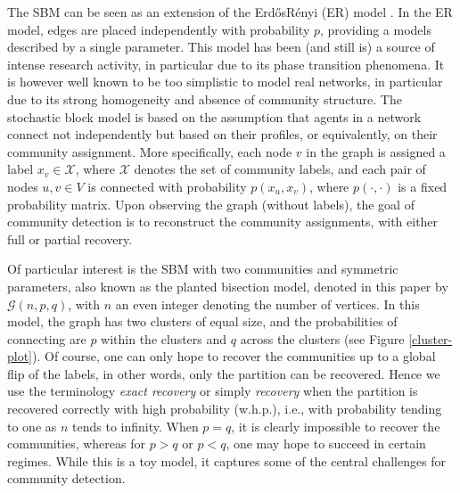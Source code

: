 \documentclass[english]{article}
\newcommand{\X}{\mathcal{X}}
\newcommand{\1}{\textbf{1}}
\begin{document}
The SBM can be seen as an extension of the Erd\H{o}sR\'enyi (ER) model \cite{ER-seminal,ER2}. 
In the ER model, edges are placed independently with probability $p$, providing a models described by a single parameter.
This model has been (and still is) a source of intense research activity, in particular due to its phase transition phenomena.  
It is however well known to be too simplistic to model real networks, in particular due to its strong homogeneity and absence of community structure. 
The stochastic block model is based on the assumption that agents in a network connect not independently but based on their profiles, or equivalently, on their community assignment. 
More specifically, each node $v$ in the graph is assigned a label $x_v \in \X$, where $\X$ denotes the set of community labels, and each pair of nodes $u,v \in V$ is connected with probability $p(x_u,x_v)$, where $p(\cdot, \cdot)$ is a fixed probability matrix. Upon observing the graph (without labels), the goal of community detection is to reconstruct the community assignments, with either full or partial recovery.%


Of particular interest is the SBM with two communities and symmetric parameters, also known as the planted bisection model, denoted in this paper by $\mathcal{G}(n,p,q)$, with $n$ an even integer denoting the number of vertices. In this model, the graph has two clusters of equal size, and the probabilities of connecting are $p$ within the clusters and $q$ across the clusters (see Figure \ref{cluster-plot}). Of course, one can only hope to recover the communities up to a global flip of the labels, in other words, only the partition can be recovered. Hence we use the terminology {\it exact recovery} or simply {\it recovery} when the partition is recovered correctly with high probability (w.h.p.), i.e., with probability tending to one as $n$ tends to infinity. When $p=q$, it is clearly impossible to recover the communities, whereas for $p>q$ or $p<q$, one may hope to succeed in certain regimes.
While this is a toy model, it captures some of the central challenges for community detection. 
\end{document}
